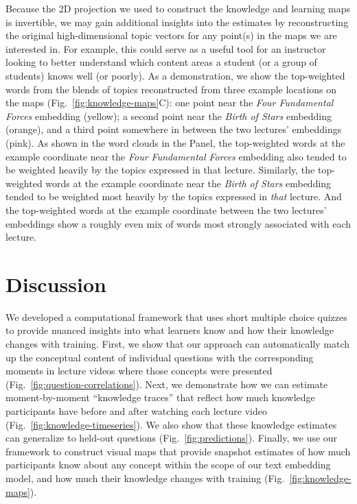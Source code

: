 \documentclass[10pt]{article}
\begin{document}
Because the 2D projection we used to construct the knowledge and learning maps
is invertible, we may gain additional insights into the estimates
by reconstructing the original high-dimensional topic vectors for any point(s)
in the maps we are interested in. For example, this could serve as a useful
tool for an instructor looking to better understand which content areas a
student (or a group of students) knows well (or poorly). As a demonstration, we
show the top-weighted words from the blends of topics reconstructed from three
example locations on the maps (Fig.~\ref{fig:knowledge-maps}C): one point near
the \textit{Four Fundamental Forces} embedding (yellow); a second point near
the \textit{Birth of Stars} embedding (orange), and a third point somewhere in
between the two lectures' embeddings (pink). As shown in the word clouds in the
Panel, the top-weighted words at the example coordinate near the \textit{Four
Fundamental Forces} embedding also tended to be weighted heavily by the topics
expressed in that lecture. Similarly, the top-weighted words at the example
coordinate near the \textit{Birth of Stars} embedding tended to be weighted
most heavily by the topics expressed in \textit{that} lecture. And the
top-weighted words at the example coordinate between the two lectures'
embeddings show a roughly even mix of words most strongly associated with each
lecture.

\section*{Discussion}

We developed a computational framework that uses short multiple choice quizzes
to provide nuanced insights into what learners know and how their knowledge
changes with training. First, we show that our approach can automatically match
up the conceptual content of individual questions with the corresponding
moments in lecture videos where those concepts were presented
(Fig.~\ref{fig:question-correlations}). Next, we demonstrate how we can
estimate moment-by-moment ``knowledge traces'' that reflect how much knowledge
participants have before and after watching each lecture video
(Fig.~\ref{fig:knowledge-timeseries}). We also show that these knowledge
estimates can generalize to held-out questions (Fig.~\ref{fig:predictions}).
Finally, we use our framework to construct visual maps that provide snapshot
estimates of how much participants know about any concept within the scope of
our text embedding model, and how much their knowledge changes with training
(Fig.~\ref{fig:knowledge-maps}).
\end{document}
